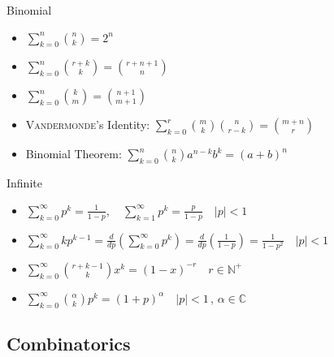\documentclass[landscape]{article}
\begin{document}
\begin{multicols*}{2}
\begin{multicols}{2}
\columnbreak

Binomial
\begin{itemize}
  \item $\displaystyle\sum_{k=0}^n \binom{n}{k} = 2^n$
  \item $\displaystyle\sum_{k=0}^n \binom{r+k}{k}=\binom{r+n+1}{n}$
  \item $\displaystyle\sum_{k=0}^n \binom{k}{m}=\binom{n+1}{m+1}$
  \item \textsc{Vandermonde}'s Identity:
    $\displaystyle\sum_{k=0}^r \binom{m}{k}\binom{n}{r-k}=\binom{m+n}{r}$
  \item Binomial Theorem:
    $\displaystyle\sum_{k=0}^n \binom{n}{k}a^{n-k}b^k = (a+b)^n$ 
\end{itemize}

\end{multicols}

\pagebreak

Infinite
\begin{itemize}
  \item $\displaystyle\sum_{k=0}^\infty p^k = \frac{1}{1-p},
    \quad \sum_{k=1}^\infty p^k = \frac{p}{1-p} \quad |p|<1$
  \item $\displaystyle\sum_{k=0}^\infty kp^{k-1}
    = \displaystyle\frac{d}{dp}\left(\sum_{k=0}^\infty p^k\right)
    = \displaystyle\frac{d}{dp}\left(\frac{1}{1-p}\right)
    = \frac{1}{1-p^2} \quad |p|<1$
  \item $\displaystyle\sum_{k=0}^\infty \binom{r+k-1}{k} x^k = (1-x)^{-r}
    \quad r\in\mathbb N^+$
  \item $\displaystyle\sum_{k=0}^\infty \binom{\alpha}{k} p^k 
    = (1+p)^\alpha \quad |p|<1\,,\,\alpha \in \mathbb C$
\end{itemize}

%

\subsection{Combinatorics}


\end{multicols*}
\end{document}
